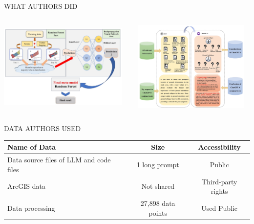 \documentclass[11pt, aspectratio=169]{beamer}
\begin{document}
\begin{frame}{\MakeUppercase{What authors did}}

\begin{columns}[c]
    \begin{column}{.5\textwidth}
        \includegraphics[width=7cm,height=4.5cm]{images/algo}
    \end{column}
    \begin{column}{.5\textwidth}
        \includegraphics[width=7cm,height=4.5cm]{images/llm}
    \end{column}
\end{columns}

\end{frame}

\begin{frame}{\MakeUppercase{Data authors used}}

\begin{table}[h]
\centering
\begin{tabular}{|l|c|c|}
\hline
\textbf{Name of Data} & \textbf{Size} & \textbf{Accessibility} \\
\hline
Data source files of LLM and code files & 1 long prompt & Public \\
\hline
ArcGIS data & Not shared & Third-party rights \\
\hline
Data processing & 27,898 data points & Used Public \\
\hline
\end{tabular}
\end{table}

\end{frame}
\end{document}

